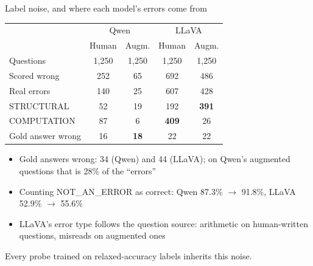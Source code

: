 \documentclass[10pt,aspectratio=169]{beamer}
\newcommand{\cls}[1]{\MakeUppercase{#1}}
\newcommand{\hl}[1]{\alert{\textbf{#1}}}
\begin{document}
\begin{frame}{Label noise, and where each model's errors come from}
\centering
\footnotesize
\begin{tabular}{lcc|cc}
\toprule
 & \multicolumn{2}{c|}{Qwen} & \multicolumn{2}{c}{LLaVA} \\
 & Human & Augm. & Human & Augm. \\
\midrule
Questions & 1,250 & 1,250 & 1,250 & 1,250 \\
Scored wrong & 252 & 65 & 692 & 486 \\
Real errors & 140 & 25 & 607 & 428 \\
\quad \cls{structural} & 52 & 19 & 192 & \hl{391} \\
\quad \cls{computation} & 87 & 6 & \hl{409} & 26 \\
Gold answer wrong & 16 & \hl{18} & 22 & 22 \\
\bottomrule
\end{tabular}
\vspace{0.3em}
\raggedright
\begin{itemize}\footnotesize
\item Gold answers wrong: 34 (Qwen) and 44 (LLaVA); on Qwen's augmented
questions that is 28\% of the ``errors''
\item Counting \cls{not\_an\_error} as correct: Qwen 87.3\% $\to$ 91.8\%,
LLaVA 52.9\% $\to$ 55.6\%
\item LLaVA's error type follows the question source: arithmetic on
human-written questions, misreads on augmented ones
\end{itemize}
{\footnotesize Every probe trained on relaxed-accuracy labels inherits this noise.\par}
\end{frame}
\end{document}
